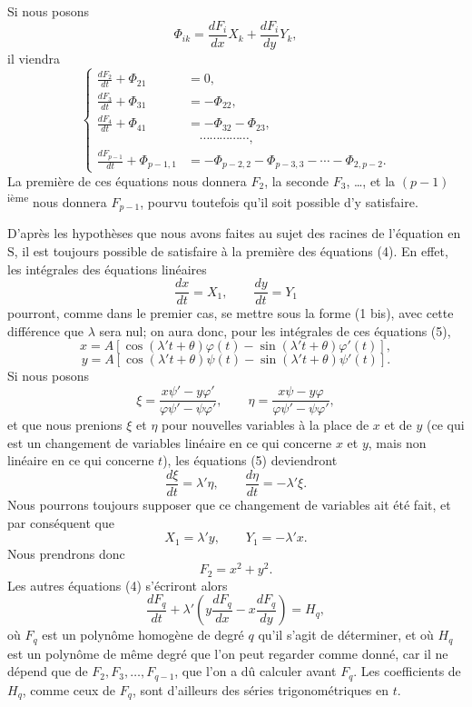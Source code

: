 \documentclass[11pt]{article}
\begin{document}
Si nous posons
\[
\Phi_{ik}=\frac{dF_i}{dx}X_k+\frac{dF_i}{dy}Y_k,
\]
il viendra
\begin{equation}
\left\{
\begin{aligned}
\frac{dF_2}{dt}+\Phi_{21}&=0,\\
\frac{dF_3}{dt}+\Phi_{31}&=-\Phi_{22},\\
\frac{dF_4}{dt}+\Phi_{41}&=-\Phi_{32}-\Phi_{23},\\
&\hspace{1em}\cdots\cdots\cdots\cdots\cdots,\\
\frac{dF_{p-1}}{dt}+\Phi_{p-1,1}&=-\Phi_{p-2,2}-\Phi_{p-3,3}-\cdots-\Phi_{2,p-2}.
\end{aligned}
\right.
\tag{4}
\end{equation}
La première de ces équations nous donnera $F_2$, la seconde $F_3$, \ldots, et la $(p-1)$\textsuperscript{ième} nous donnera $F_{p-1}$, pourvu toutefois qu’il soit possible d’y satisfaire.

D’après les hypothèses que nous avons faites au sujet des racines de l’équation en $\mathrm{S}$, il est toujours possible de satisfaire à la première des équations (4). En effet, les intégrales des équations linéaires
\begin{equation}
\frac{dx}{dt}=X_1,
\qquad
\frac{dy}{dt}=Y_1
\tag{5}
\end{equation}
pourront, comme dans le premier cas, se mettre sous la forme (1 bis), avec cette différence que $\lambda$ sera nul; on aura donc, pour les intégrales de ces équations (5),
\[
x=A\left[\cos(\lambda't+\theta)\varphi(t)-\sin(\lambda't+\theta)\varphi'(t)\right],
\]
\[
y=A\left[\cos(\lambda't+\theta)\psi(t)-\sin(\lambda't+\theta)\psi'(t)\right].
\]
Si nous posons
\[
\xi=\frac{x\psi'-y\varphi'}{\varphi\psi'-\psi\varphi'},
\qquad
\eta=\frac{x\psi-y\varphi}{\varphi\psi'-\psi\varphi'},
\]
et que nous prenions $\xi$ et $\eta$ pour nouvelles variables à la place de $x$ et de $y$ (ce qui est un changement de variables linéaire en ce qui concerne $x$ et $y$, mais non linéaire en ce qui concerne $t$), les équations (5) deviendront
\[
\frac{d\xi}{dt}=\lambda'\eta,
\qquad
\frac{d\eta}{dt}=-\lambda'\xi.
\]
Nous pourrons toujours supposer que ce changement de variables ait été fait, et par conséquent que
\[
X_1=\lambda'y,
\qquad
Y_1=-\lambda'x.
\]
Nous prendrons donc
\[
F_2=x^2+y^2.
\]
Les autres équations (4) s’écriront alors
\begin{equation}
\frac{dF_q}{dt}+\lambda'\left(y\frac{dF_q}{dx}-x\frac{dF_q}{dy}\right)=H_q,
\tag{6}
\end{equation}
où $F_q$ est un polynôme homogène de degré $q$ qu’il s’agit de déterminer, et où $H_q$ est un polynôme de même degré que l’on peut regarder comme donné, car il ne dépend que de $F_2,F_3,\ldots,F_{q-1}$, que l’on a dû calculer avant $F_q$. Les coefficients de $H_q$, comme ceux de $F_q$, sont d’ailleurs des séries trigonométriques en $t$.
\end{document}
